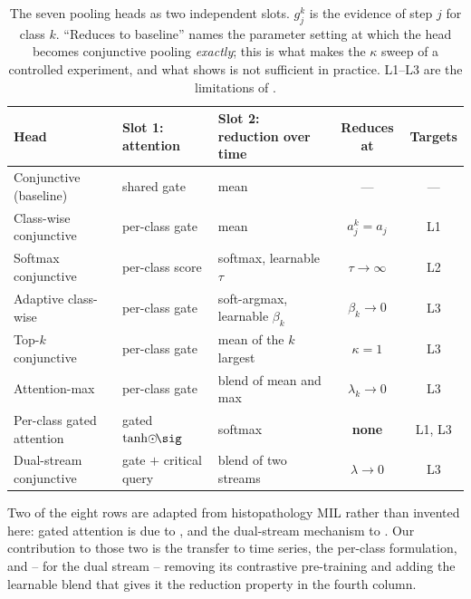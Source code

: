 \begin{table}[t]
\caption{The seven pooling heads as two independent slots. $g_j^k$ is the evidence of step $j$ for
class $k$. ``Reduces to baseline'' names the parameter setting at which the head becomes conjunctive
pooling \emph{exactly}; this is what makes the $\kappa$ sweep of  a controlled
experiment, and what  shows is not sufficient in practice. L1--L3 are the
limitations of .}
\label{tab:heads}
\begin{center}
\scriptsize
\setlength{\tabcolsep}{3.5pt}
\begin{tabular}{lllcc}
\toprule
\textbf{Head} & \textbf{Slot 1: attention} & \textbf{Slot 2: reduction over time} &
\textbf{Reduces at} & \textbf{Targets} \\
\midrule
Conjunctive (baseline)    & shared gate    & mean                            & --- & --- \\
Class-wise conjunctive    & per-class gate & mean                            & $a_j^k = a_j$ & L1 \\
Softmax conjunctive       & per-class score& softmax, learnable $\tau$       & $\tau \to \infty$ & L2 \\
Adaptive class-wise       & per-class gate & soft-argmax, learnable $\beta_k$& $\beta_k \to 0$ & L3 \\
Top-$k$ conjunctive       & per-class gate & mean of the $k$ largest         & $\kappa = 1$ & L3 \\
Attention-max             & per-class gate & blend of mean and max           & $\lambda_k \to 0$ & L3 \\
Per-class gated attention & gated $\tanh\!\odot\!\sig$ & softmax             & \textbf{none} & L1, L3 \\
Dual-stream conjunctive   & gate $+$ critical query & blend of two streams   & $\lambda \to 0$ & L3 \\
\bottomrule
\end{tabular}
\end{center}
\end{table}

Two of the eight rows are adapted from histopathology MIL rather than invented here: gated attention
is due to \citet{ilse2018attention}, and the dual-stream mechanism to \citet{li2021dsmil}. Our
contribution to those two is the transfer to time series, the per-class formulation, and -- for the
dual stream -- removing its contrastive pre-training and adding the learnable blend that gives it
the reduction property in the fourth column.

